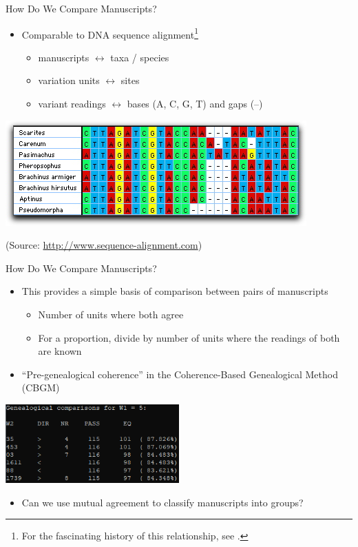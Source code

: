 \documentclass[10pt]{beamer}
\begin{document}
	\begin{frame}{How Do We Compare Manuscripts?}
		\begin{itemize}
			\item Comparable to DNA sequence alignment\footnote{For the fascinating history of this relationship, see \cite{Lin16}.}
			\begin{itemize}
				\item manuscripts $\longleftrightarrow$ taxa / species
				\item variation units $\longleftrightarrow$ sites
				\item variant readings $\longleftrightarrow$ bases (A, C, G, T) and gaps (–)
			\end{itemize}
		\end{itemize}
		\begin{center}
			\includegraphics[width=\textwidth]{../graphics/sequence_alignment.jpg}
			
			\footnotesize(Source: \url{http://www.sequence-alignment.com})
		\end{center}	
	\end{frame}
	\begin{frame}{How Do We Compare Manuscripts?}
		\begin{itemize}
			\item This provides a simple basis of comparison between pairs of manuscripts
			\begin{itemize}
				\item Number of units where both agree
				\item For a proportion, divide by number of units where the readings of both are known
			\end{itemize}
			\item ``Pre-genealogical coherence'' in the Coherence-Based Genealogical Method (CBGM)
		\end{itemize}
		\begin{center}
			\includegraphics[width=0.5\textwidth]{../graphics/compare_witnesses.png}
		\end{center}
		\begin{itemize}
			\item Can we use mutual agreement to classify manuscripts into groups?
		\end{itemize}
	\end{frame}
\end{document}
